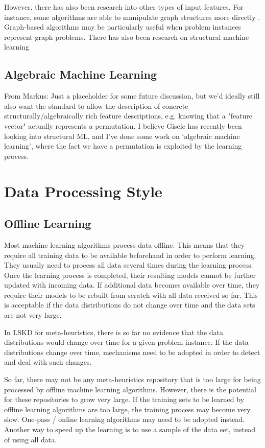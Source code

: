 \documentclass{article}
\begin{document}
However, there has also been research into other types of input features. For instance, some algorithms are able to manipulate graph structures more directly \cite{Torsello2011,Bai2015}. Graph-based algorithms may be particularly useful when problem instances represent graph problems. There has also been research on structural machine learning 

\subsection{Algebraic Machine Learning}

From Markus: Just a placeholder for some future discussion, but we'd ideally still
also want the standard to allow the description of concrete
structurally/algebraically rich feature descriptions, e.g. knowing
that a "feature vector" actually represents a permutation. I believe
Gisele has recently been looking into structural ML, and I've done some
work on `algebraic machine learning', where the fact we have a
permutation is exploited by the learning process. 



\section{Data Processing Style}

\subsection{Offline Learning}

Most machine learning algorithms process data offline. This means  that they require all training data to be available beforehand in order to perform learning. They usually need to process all data several times during the learning process. Once the learning process is completed, their resulting models cannot be further updated with incoming data. If additional data becomes available over time, they require their models to be rebuilt from scratch with all data received so far. This is acceptable if the  data distributions do not change over time and the data sets are not very large. 

In LSKD for meta-heuristics, there is so far no evidence that the data distributions would change over time for a given problem instance. If the data distributions change over time, mechanisms need to be adopted in order to detect and deal with such changes. 

So far, there may not be any meta-heuristics repository that is too large for being processed by offline machine learning algorithms. However, there is the potential for these repositories to grow very large. If the training sets to be learned by offline learning algorithms are too large, the training process may become very slow. One-pass / online learning algorithms may need to be adopted instead. Another way to speed up the learning is to use a sample of the data set, instead of using all data.
\end{document}
